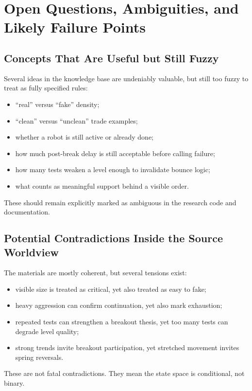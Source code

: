 \section{Open Questions, Ambiguities, and Likely Failure Points}

\subsection{Concepts That Are Useful but Still Fuzzy}

Several ideas in the knowledge base are undeniably valuable, but still too fuzzy to treat as fully specified rules:
\begin{itemize}
  \item ``real'' versus ``fake'' density;
  \item ``clean'' versus ``unclean'' trade examples;
  \item whether a robot is still active or already done;
  \item how much post-break delay is still acceptable before calling failure;
  \item how many tests weaken a level enough to invalidate bounce logic;
  \item what counts as meaningful support behind a visible order.
\end{itemize}

These should remain explicitly marked as ambiguous in the research code and documentation.

\subsection{Potential Contradictions Inside the Source Worldview}

The materials are mostly coherent, but several tensions exist:
\begin{itemize}
  \item visible size is treated as critical, yet also treated as easy to fake;
  \item heavy aggression can confirm continuation, yet also mark exhaustion;
  \item repeated tests can strengthen a breakout thesis, yet too many tests can degrade level quality;
  \item strong trends invite breakout participation, yet stretched movement invites spring reversals.
\end{itemize}

These are not fatal contradictions.
They mean the state space is conditional, not binary.

